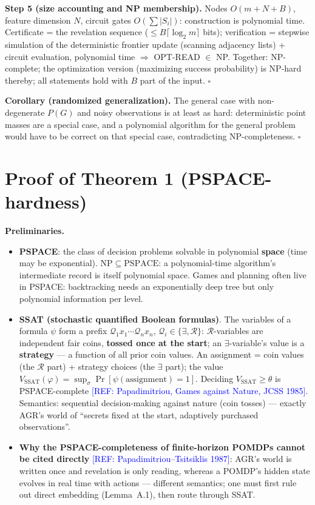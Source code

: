 \documentclass{article}
\newcommand{\refadd}[1]{\textcolor{blue}{[REF: #1]}}
\providecommand{\qed}{\hfill$\square$}
\begin{document}
\textbf{Step 5 (size accounting and NP membership).} Nodes $O(m+N+B)$, feature dimension $N$, circuit gates $O(\sum|S_i|)$: construction is polynomial time. Certificate = the revelation sequence ($\le B\lceil\log_2 m\rceil$ bits); verification = stepwise simulation of the deterministic frontier update (scanning adjacency lists) + circuit evaluation, polynomial time $\Rightarrow$ OPT-READ $\in$ NP. Together: NP-complete; the optimization version (maximizing success probability) is NP-hard thereby; all statements hold with $B$ part of the input. \qed{}

\textbf{Corollary (randomized generalization).} The general case with non-degenerate $P(G)$ and noisy observations is at least as hard: deterministic point masses are a special case, and a polynomial algorithm for the general problem would have to be correct on that special case, contradicting NP-completeness. \qed{}

\section{Proof of Theorem 1 (PSPACE-hardness)}
\label{app:thm1}

\textbf{Preliminaries.}
\begin{itemize}
\item \textbf{PSPACE}: the class of decision problems solvable in polynomial \textbf{space} (time may be exponential). $\mathrm{NP}\subseteq\mathrm{PSPACE}$: a polynomial-time algorithm's intermediate record is itself polynomial space. Games and planning often live in PSPACE: backtracking needs an exponentially deep tree but only polynomial information per level.
\item \textbf{SSAT (stochastic quantified Boolean formulas)}. The variables of a formula $\psi$ form a prefix $\mathcal Q_1x_1\cdots\mathcal Q_nx_n$, $\mathcal Q_i\in\{\exists,\mathcal R\}$: $\mathcal R$-variables are independent fair coins, \textbf{tossed once at the start}; an $\exists$-variable's value is a \textbf{strategy} --- a function of all prior coin values. An assignment = coin values (the $\mathcal R$ part) + strategy choices (the $\exists$ part); the value $V_{\text{SSAT}}(\varphi)=\sup_\sigma\Pr[\psi(\text{assignment})=1]$. Deciding $V_{\text{SSAT}}\ge\theta$ is PSPACE-complete \refadd{Papadimitriou, Games against Nature, JCSS 1985}. Semantics: sequential decision-making against nature (coin tosses) --- exactly AGR's world of ``secrets fixed at the start, adaptively purchased observations''.
\item \textbf{Why the PSPACE-completeness of finite-horizon POMDPs cannot be cited directly} \refadd{Papadimitriou--Tsitsiklis 1987}: AGR's world is written once and revelation is only reading, whereas a POMDP's hidden state evolves in real time with actions --- different semantics; one must first rule out direct embedding (Lemma~A.1), then route through SSAT.
\end{itemize}
\end{document}
